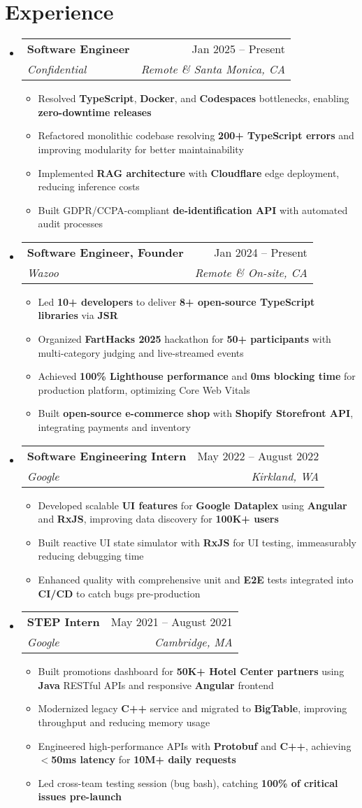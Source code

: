 \documentclass[letterpaper,11pt]{article}
\makeatletter
\newcommand{\resumeItem}[1]{
  \item\small{
    {#1 \vspace{-2pt}}
  }
}
\newcommand{\resumeSubheading}[4]{
  \vspace{-2pt}\item
    \begin{tabular*}{0.97\textwidth}[t]{l@{\extracolsep{\fill}}r}
      \textbf{#1} & #2 \\
      \textit{\small#3} & \textit{\small #4} \\
    \end{tabular*}\vspace{-7pt}
}
\newcommand{\resumeSubHeadingListStart}{\begin{itemize}[leftmargin=0.15in, label={}]}
\newcommand{\resumeSubHeadingListEnd}{\end{itemize}}
\newcommand{\resumeItemListStart}{\begin{itemize}}
\newcommand{\resumeItemListEnd}{\end{itemize}\vspace{-5pt}}
\makeatother
\begin{document}
\section{Experience}
\resumeSubHeadingListStart
  \resumeSubheading
    {Software Engineer}{Jan 2025 -- Present}
    {Confidential}{Remote \& Santa Monica, CA}
    \resumeItemListStart
      \resumeItem{Resolved \textbf{TypeScript}, \textbf{Docker}, and \textbf{Codespaces} bottlenecks, enabling \textbf{zero-downtime releases}}
      \resumeItem{Refactored monolithic codebase resolving \textbf{200+ TypeScript errors} and improving modularity for better maintainability}
      \resumeItem{Implemented \textbf{RAG architecture} with \textbf{Cloudflare} edge deployment, reducing inference costs}
      \resumeItem{Built GDPR/CCPA-compliant \textbf{de-identification API} with automated audit processes}
    \resumeItemListEnd
  
  \resumeSubheading
    {Software Engineer, Founder}{Jan 2024 -- Present}
    {Wazoo}{Remote \& On-site, CA}
    \resumeItemListStart
      \resumeItem{Led \textbf{10+ developers} to deliver \textbf{8+ open-source TypeScript libraries} via \textbf{JSR}}
      \resumeItem{Organized \textbf{FartHacks 2025} hackathon for \textbf{50+ participants} with multi-category judging and live-streamed events}
      \resumeItem{Achieved \textbf{100\% Lighthouse performance} and \textbf{0ms blocking time} for production platform, optimizing Core Web Vitals}
      \resumeItem{Built \textbf{open-source e-commerce shop} with \textbf{Shopify Storefront API}, integrating payments and inventory}
    \resumeItemListEnd

  \resumeSubheading
    {Software Engineering Intern}{May 2022 -- August 2022}
    {Google}{Kirkland, WA}
    \resumeItemListStart
      \resumeItem{Developed scalable \textbf{UI features} for \textbf{Google Dataplex} using \textbf{Angular} and \textbf{RxJS}, improving data discovery for \textbf{100K+ users}}
      \resumeItem{Built reactive UI state simulator with \textbf{RxJS} for UI testing, immeasurably reducing debugging time}
      \resumeItem{Enhanced quality with comprehensive unit and \textbf{E2E} tests integrated into \textbf{CI/CD} to catch bugs pre-production}
    \resumeItemListEnd

  \resumeSubheading
    {STEP Intern}{May 2021 -- August 2021}
    {Google}{Cambridge, MA}
    \resumeItemListStart
      \resumeItem{Built promotions dashboard for \textbf{50K+ Hotel Center partners} using \textbf{Java} RESTful APIs and responsive \textbf{Angular} frontend}
      \resumeItem{Modernized legacy \textbf{C++} service and migrated to \textbf{BigTable}, improving throughput and reducing memory usage}
      \resumeItem{Engineered high-performance APIs with \textbf{Protobuf} and \textbf{C++}, achieving \textbf{$<$50ms latency} for \textbf{10M+ daily requests}}
      \resumeItem{Led cross-team testing session (bug bash), catching \textbf{100\% of critical issues pre-launch}}
    \resumeItemListEnd
\resumeSubHeadingListEnd
\end{document}
